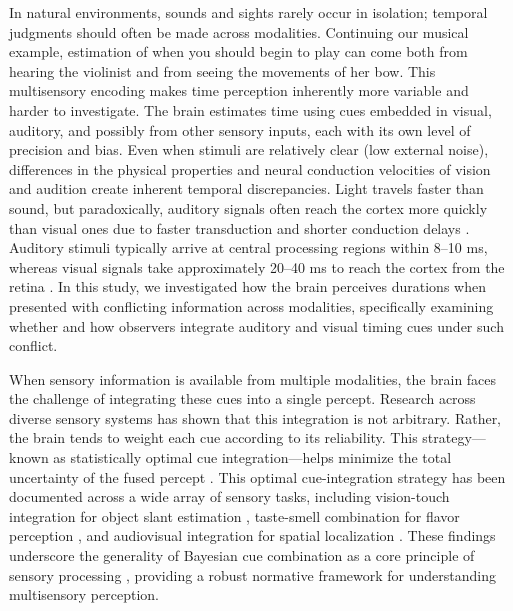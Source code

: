\documentclass{biorxiv}
\providecommand{\citep}[1]{\cite{#1}}
\begin{document}
In natural environments, sounds and sights rarely occur in isolation; temporal judgments should often be made across modalities. Continuing our musical example, estimation of when you should begin to play can come both from hearing the violinist and from seeing the movements of her bow. This multisensory encoding makes time perception inherently more variable and harder to investigate. The brain estimates time using cues embedded in visual, auditory, and possibly from other sensory inputs, each with its own level of precision and bias. Even when stimuli are relatively clear (low external noise), differences in the physical properties and neural conduction velocities of vision and audition create inherent temporal discrepancies. Light travels faster than sound, but paradoxically, auditory signals often reach the cortex more quickly than visual ones due to faster transduction and shorter conduction delays \citep{zoefel2017oscillatory}. Auditory stimuli typically arrive at central processing regions within 8--10 ms, whereas visual signals take approximately 20--40 ms to reach the cortex from the retina \citep{ king1985integration,vroomen2010perception}. In this study, we investigated how the brain perceives durations when presented with conflicting information across modalities, specifically examining whether and how observers integrate auditory and visual timing cues under such conflict.



When sensory information is available from multiple modalities, the brain faces the challenge of integrating these cues into a single percept. Research across diverse sensory systems has shown that this integration is not arbitrary. Rather, the brain tends to weight each cue according to its reliability. This strategy---known as statistically optimal cue integration---helps minimize the total uncertainty of the fused percept \citep{maloney1989statistical,young1993perturbation,landy1995measurement,ernst2002humans}. This optimal cue-integration strategy has been documented across a wide array of sensory tasks, including vision-touch integration for object slant estimation \citep{ernst2002humans,hillis2002combining}, taste-smell combination for flavor perception \citep{maier2020adaptive}, and audiovisual integration for spatial localization \citep{alais2004ventriloquist,negen2018bayes}. These findings underscore the generality of Bayesian cue combination as a core principle of sensory processing \citep{landy2001ideal,landy2011ideal,wolpert2011principles,alais2019cue,rossi2021mechanisms}, providing a robust normative framework for understanding multisensory perception.
\end{document}
